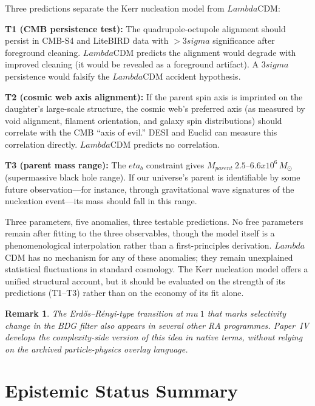 \documentclass[11pt]{article}
\def\Lambda{Lambda}%
\def\sigma{sigma}%
\def\mu{mu}%
\def\eta{eta}%
\def\mathrm#1{#1}%
\def\times{x}%
\def\approx{~}%
\newtheorem{remark}{Remark}
\begin{document}
Three predictions separate the Kerr nucleation model from $\Lambda$CDM:

\textbf{T1 (CMB persistence test):} The quadrupole-octupole alignment should persist in CMB-S4 and LiteBIRD data with $> 3\sigma$ significance after foreground cleaning. $\Lambda$CDM predicts the alignment would degrade with improved cleaning (it would be revealed as a foreground artifact). A $3\sigma$ persistence would falsify the $\Lambda$CDM accident hypothesis.

\textbf{T2 (cosmic web axis alignment):} If the parent spin axis is imprinted on the daughter's large-scale structure, the cosmic web's preferred axis (as measured by void alignment, filament orientation, and galaxy spin distributions) should correlate with the CMB ``axis of evil.'' DESI and Euclid can measure this correlation directly. $\Lambda$CDM predicts no correlation.

\textbf{T3 (parent mass range):} The $\eta_b$ constraint gives $M_{\mathrm{parent}} \approx 2.5$--$6.6 \times 10^6\,M_\odot$ (supermassive black hole range). If our universe's parent is identifiable by some future observation---for instance, through gravitational wave signatures of the nucleation event---its mass should fall in this range.

Three parameters, five anomalies, three testable predictions. No free parameters remain after fitting to the three observables, though the model itself is a phenomenological interpolation rather than a first-principles derivation. $\Lambda$CDM has no mechanism for any of these anomalies; they remain unexplained statistical fluctuations in standard cosmology. The Kerr nucleation model offers a unified structural account, but it should be evaluated on the strength of its predictions (T1--T3) rather than on the economy of its fit alone.

\begin{remark}
The Erd\H{o}s--R\'enyi-type transition at $\mu\approx 1$ that marks selectivity change in the BDG filter also appears in several other RA programmes. Paper~IV develops the complexity-side version of this idea in native terms, without relying on the archived particle-physics overlay language.
\end{remark}

\section{Epistemic Status Summary}
\label{sec:status}
\end{document}
